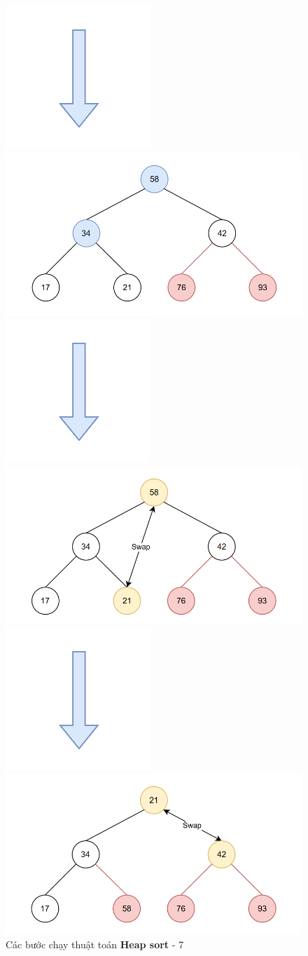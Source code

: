 \begin{figure}[H]
    \centering
    \includegraphics[width=0.1\linewidth]{img/heap_sort/arrow.png}
    \vspace{0.01cm}

    \includegraphics[width=0.5\linewidth]{img/heap_sort/16.png}
    \vspace{0.01cm}

    \includegraphics[width=0.1\linewidth]{img/heap_sort/arrow.png}
    \vspace{0.01cm}

    \includegraphics[width=0.5\linewidth]{img/heap_sort/17.png}
    \vspace{0.01cm}

    \includegraphics[width=0.1\linewidth]{img/heap_sort/arrow.png}
    \vspace{0.01cm}

    \includegraphics[width=0.5\linewidth]{img/heap_sort/18.png}

    \caption{Các bước chạy thuật toán \textbf{Heap sort} - 7}
\end{figure}


